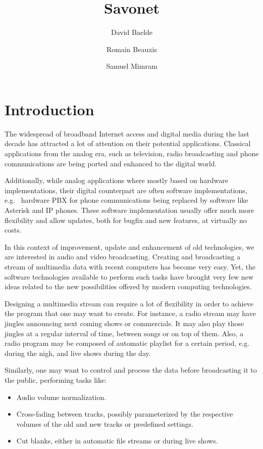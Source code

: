 \documentclass{llncs}
\title{Savonet}
\author{David Baelde \and Romain Beauxis \and Samuel Mimram}
\newcommand{\eg}{e.g.~}
\begin{document}
\maketitle

\section*{Introduction}

The widespread of broadband Internet access and digital media during the last
decade has attracted a lot of attention on their potential applications.
Classical applications from the analog era, such as television, 
radio broadcasting and phone communications are being ported and enhanced to the digital
world.

Additionally, while analog applications where mostly based on hardware implementations,
their digital counterpart are often software implementations, \eg{} hardware PBX for phone
communications being replaced by software like Asterisk and IP phones. These software
implementation usually offer much more flexibility and allow updates, both 
for bugfix and new features, at virtually no costs.

In this context of improvement, update and enhancement of old technologies, we 
are interested in audio and video broadcasting. Creating and broadcasting 
a stream of multimedia data with recent computers has become very easy.
Yet, the software technologies available to perform such tasks
have brought very few new ideas related to the new possibilities offered
by modern computing technologies.

Designing a multimedia stream can require a lot of flexibility 
in order to achieve the program that one may want to create. For instance,
a radio stream may have jingles announcing next coming shows
or commercials. It may also play those jingles at a regular 
interval of time, between songs or on top of them. Also, a radio program may be 
composed of automatic playlist for a certain period, \eg{} during the nigh, 
and live shows during the day.

Similarly, one may want to control and process the data before broadcasting
it to the public, performing tasks like:
\begin{itemize}
 \item Audio volume normalization.
 \item Cross-fading between tracks, possibly parameterized by the respective volumes
of the old and new tracks or predefined settings.
 \item Cut blanks, either in automatic file streams or during live shows.
\end{itemize}
\end{document}
